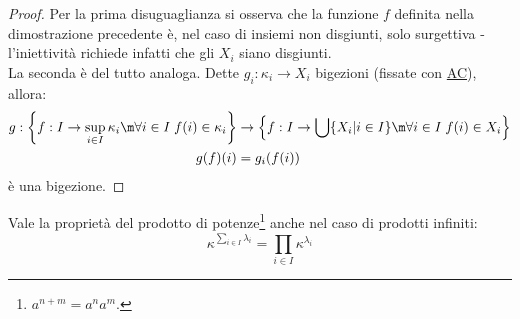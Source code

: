 \documentclass[11pt]{scrartcl}
\begin{document}
\begin{proof}
	Per la prima disuguaglianza si osserva che la funzione $f$ definita nella dimostrazione precedente è, nel caso di insiemi non disgiunti, solo surgettiva - l'iniettività richiede infatti che gli $X_i$ siano disgiunti.\\
	La seconda è del tutto analoga. Dette $g_i : \kappa_i \rightarrow X_i$ bigezioni (fissate con \hyperref[ax9]{AC}), allora:
	\begin{align*}
		g : \left\{f : I \rightarrow \sup_{i \in I} \kappa_i \m \forall i \in I \; f(i) \in \kappa_i\right\} &\rightarrow \left\{f : I \rightarrow \bigcup \{X_i | i \in I\} \m \forall i \in I \; f(i) \in X_i\right\} \\
																								     g(f)(i) & = g_i(f(i))
	\end{align*}
	è una bigezione.
\end{proof}

\begin{remark}
	Vale la proprietà del prodotto di potenze\footnote{$a^{n+m} = a^na^m$.} anche nel caso di prodotti infiniti:
	\[ \kappa^{\sum_{i \in I}\lambda_i} = \prod_{i \in I} \kappa^{\lambda_i}
		\]
\end{remark}
\end{document}

